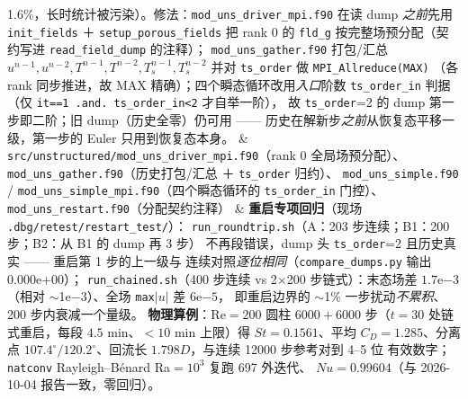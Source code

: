 {\begin{longtable}
1.6\%，长时统计被污染）。修法：\texttt{mod\_uns\_driver\_mpi.f90} 在读 dump
\emph{之前}先用 \texttt{init\_fields} ＋ \texttt{setup\_porous\_fields} 把 rank 0 的
\texttt{fld\_g} 按完整场预分配（契约写进 \texttt{read\_field\_dump} 的注释）；
\texttt{mod\_uns\_gather.f90} 打包/汇总 $u^{n-1},u^{n-2},T^{n-1},T^{n-2},
T_s^{n-1},T_s^{n-2}$ 并对 \texttt{ts\_order} 做 \texttt{MPI\_Allreduce(MAX)}
（各 rank 同步推进，故 MAX 精确）；四个瞬态循环改用\emph{入口}阶数
\texttt{ts\_order\_in} 判据（仅 \texttt{it==1 .and. ts\_order\_in<2} 才自举一阶），
故 \texttt{ts\_order}=2 的 dump 第一步即二阶；旧 dump（历史全零）仍可用 ——
历史在解新步\emph{之前}从恢复态平移一级，第一步的 Euler 只用到恢复态本身。
& \texttt{src/unstructured/mod\_uns\_driver\_mpi.f90}（rank 0 全局场预分配）、
\texttt{mod\_uns\_gather.f90}（历史打包/汇总 ＋ \texttt{ts\_order} 归约）、
\texttt{mod\_uns\_simple.f90} / \texttt{mod\_uns\_simple\_mpi.f90}（四个瞬态循环的
\texttt{ts\_order\_in} 门控）、\texttt{mod\_uns\_restart.f90}（分配契约注释）
& \textbf{重启专项回归}（现场 \texttt{.dbg/retest/restart\_test/}）：
\texttt{run\_roundtrip.sh}（A：203 步连续；B1：200 步；B2：从 B1 的 dump 再 3 步）
不再段错误，dump 头 \texttt{ts\_order}=2 且历史真实 —— 重启第 1 步的上一级与
连续对照\emph{逐位相同}（\texttt{compare\_dumps.py} 输出 $0.000$e$+00$）；
\texttt{run\_chained.sh}（400 步连续 vs 2$\times$200 步链式）：末态场差
$1.7$e$-3$（相对 $\sim$1e$-3$）、全场 \texttt{max}$|u|$ 差 $6$e$-5$，
即重启边界的 $\sim$1\% 一步扰动\emph{不累积}、200 步内衰减一个量级。
\textbf{物理算例}：Re$=200$ 圆柱 $6000+6000$ 步（$t=30$ 处链式重启，每段
$4.5$ min、$<10$ min 上限）得 $St=0.1561$、平均 $C_D=1.285$、分离点
$107.4^\circ/120.2^\circ$、回流长 $1.798D$，与连续 12000 步参考对到 4--5 位
有效数字；\texttt{natconv} Rayleigh--B\'enard Ra$=10^3$ 复跑 697 外迭代、
$Nu=0.99604$（与 2026-10-04 报告一致，零回归）。 \\


\end{longtable}}
